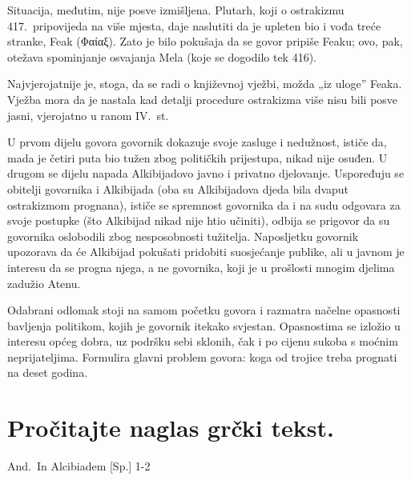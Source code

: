 Situacija, međutim, nije posve izmišljena. Plutarh, koji o ostrakizmu 417.\ pripovijeda na više mjesta, daje naslutiti da je upleten bio i vođa treće stranke, Feak (Φαίαξ). Zato je bilo pokušaja da se govor pripiše Feaku; ovo, pak, otežava spominjanje osvajanja Mela (koje se dogodilo tek 416). 

Najvjerojatnije je, stoga, da se radi o književnoj vježbi, možda „iz uloge” Feaka. Vježba mora da je nastala kad detalji procedure ostrakizma više nisu bili posve jasni, vjerojatno u ranom IV.~st.

U prvom dijelu govora govornik dokazuje svoje zasluge i nedužnost, ističe da, mada je četiri puta bio tužen zbog političkih prijestupa, nikad nije osuđen. U drugom se dijelu napada Alkibijadovo javno i privatno djelovanje. Uspoređuju se obitelji govornika i Alkibijada (oba su Alkibijadova djeda bila dvaput ostrakizmom prognana), ističe se spremnost govornika da i na sudu odgovara za svoje postupke (što Alkibijad nikad nije htio učiniti), odbija se prigovor da su govornika oslobodili zbog nesposobnosti tužitelja. Naposljetku govornik upozorava da će Alkibijad pokušati pridobiti suosjećanje publike, ali u javnom je interesu da se progna njega, a ne govornika, koji je u prošlosti mnogim djelima zadužio Atenu.

Odabrani odlomak stoji na samom početku govora i razmatra načelne opasnosti bavljenja politikom, kojih je govornik itekako svjestan. Opasnostima se izložio u interesu općeg dobra, uz podršku sebi sklonih, čak i po cijenu sukoba s moćnim neprijateljima. Formulira glavni problem govora: koga od trojice treba prognati na deset godina.


\section*{Pročitajte naglas grčki tekst.}

And.\ In Alcibiadem [Sp.] 1-2


\medskip


